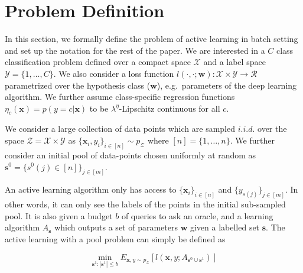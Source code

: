 \documentclass{article} %
\begin{document}
\section{Problem Definition} In this section, we formally define the problem of active learning in batch setting and set
up the notation for the rest of the paper. We are interested in a $C$ class classification problem defined over a
compact space $\mathcal{X}$ and a label space  $\mathcal{Y}=\{1,\ldots,C\}$. We also consider a loss function
$l(\cdot,\cdot;\mathbf{w}):\mathcal{X}\times \mathcal{Y} \rightarrow \mathcal{R}$ parametrized over the hypothesis class
($\mathbf{w}$), e.g.\ parameters of the deep learning algorithm. We further assume class-specific regression functions
$\eta_c(\mathbf{x})=p(y=c|\mathbf{x})$ to be \mbox{$\lambda^\eta$-Lipschitz} continuous for all $c$.

We consider a large collection of data points which are sampled $i.i.d.$ over the space
$\mathcal{Z}=\mathcal{X}\times\mathcal{Y}$ as \mbox{$\{\mathbf{x}_i,y_i\}_{i \in [n]} \sim p_\mathcal{Z}$} where
$[n]=\{1,\ldots,n\}$. We further consider an initial pool of data-points chosen uniformly at random as
\mbox{$\mathbf{s}^0=\{s^0(j) \in [n]\}_{j \in [m]}$}.

An active learning algorithm only has access to $\{\mathbf{x}_i\}_{i \in [n]}$ and $\{y_{s(j)}\}_{j \in [m] }$. In other
words, it can only see the labels of the points in the initial sub-sampled pool. It is also given a budget $b$ of
queries to ask an oracle, and a learning algorithm $A_{\mathbf{s}}$ which outputs a set of parameters $\mathbf{w}$ given
a labelled set $\mathbf{s}$. The active learning with a pool problem can simply be defined as 

\begin{equation} \min_{\mathbf{s}^1 : |\mathbf{s}^1| \leq b} E_{\mathbf{x},y \sim p_\mathcal{Z}} [l(\mathbf{x},y;
A_{\mathbf{s}^0 \cup \mathbf{s}^1})] \end{equation} 
\end{document}
